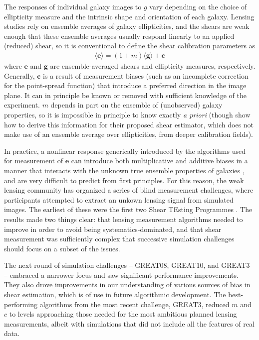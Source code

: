 \documentclass[iop]{emulateapj}
\begin{document}
The responses of individual galaxy images to $g$ vary depending on
the choice of ellipticity measure and the intrinsic shape and
orientation of each galaxy. Lensing studies rely on ensemble averages
of galaxy ellipticities, and the shears are weak enough that these ensemble averages usually respond
linearly to an applied (reduced) shear, so it is conventional to define the shear
calibration parameters as
\begin{align}
\langle \mathbf{e}\rangle = (1 + m)\langle \mathbf{g}\rangle + \mathbf{c}
\label{eqn:calibPars}
\end{align}
where $\mathbf{e}$ and $\mathbf{g}$ are ensemble-averaged shears and
ellipticity measures, respectively. Generally, $\mathbf{c}$ is a
result of measurement biases (such as an incomplete correction for the
point-spread function) that introduce a preferred direction in the
image plane. It can in principle be known or removed with sufficient
knowledge of the experiment. $m$ depends in part on the ensemble of
(unobserved) galaxy properties, so it is impossible in principle to
know exactly {\it a priori} (though \citealt{2014MNRAS.438.1880B} show
how to derive this information for their proposed shear estimator,
which does not make use of an ensemble average over ellipticities,
from deeper calibration fields).


In practice, a nonlinear response generically introduced by the algorithms
used for measurement of $\boldsymbol{e}$ can introduce both
multiplicative and additive biases in a manner that interacts with the
unknown true ensemble properties of galaxies
\citep{2007MNRAS.380..229M,2011MNRAS.414.1047Z}, and are very
difficult to predict from first principles. For this reason, the weak
lensing community has organized a series of blind measurement
challenges, where participants attempted to extract an unkown lensing
signal from simulated images.  The earliest of these were the first
two Shear TEsting Programmes \citep[STEP1,
STEP2]{2006MNRAS.368.1323H,2007MNRAS.376...13M}. The results made two
things clear: that lensing measurement algorithms needed to improve in order to avoid being
systematics-dominated,
and that shear measurement was sufficiently complex that successive
simulation challenges should focus on a subset of the issues.

The next round of simulation challenges -- GREAT08, GREAT10, and GREAT3
\citep{2009AnApS...3....6B,2013ApJS..205...12K, 2015MNRAS.450.2963M} --
embraced a narrower focus and saw significant performance
improvements. They also drove improvements in our understanding of 
various sources of bias in shear estimation, which is of use in future
algorithmic development.  The best-performing algorithms from the most
recent challenge, GREAT3, reduced $m$ and $c$ to levels approaching
those needed for the most ambitious planned lensing measurements,
albeit with simulations that did not include all the features of real
data.
\end{document}
